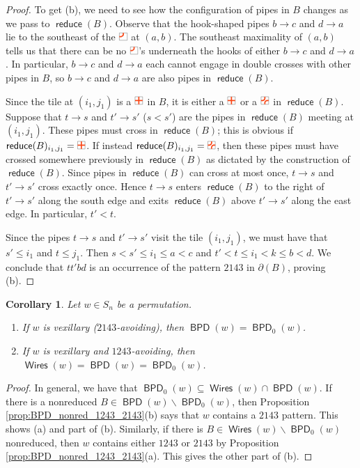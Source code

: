 \documentclass[11pt]{article}
\newtheorem{corollary}[theo]{Corollary}
\theoremstyle{definition}
\numberwithin{equation}{section}
\newcommand{\sseq}{\subseteq}
\newcommand{\sm}{\smallsetminus}
\DeclareMathOperator{\reduce}{\mathsf{reduce}}
\DeclareMathOperator{\Wires}{\mathsf{Wires}}
\DeclareMathOperator{\BPD}{\mathsf{BPD}}
\newcommand{\pipecolor}{UForange}
\newcommand{\tilescale}{0.27}
\newcommand{\drawSquare}{
    \draw[
        xshift=0.5cm,yshift=0.5cm,
        black,opacity=0.5,thin
    ] (0,0) rectangle (1,1);
}
\newcommand{\drawHorizontal}[2]{
    \draw[color=\pipecolor,very thick]
    (#1-0.5,#2) to (#1+0.5,#2);
}
\newcommand{\drawVertical}[2]{
    \draw[color=\pipecolor,very thick]
    (#1,#2-0.5) to (#1,#2+0.5);
}
\newcommand{\drawCross}[2]{
    \drawHorizontal{#1}{#2}
    \drawVertical{#1}{#2}
}
\newcommand{\drawRelbow}[2]{
    \draw[color=\pipecolor,very thick]
    (#1,#2-0.5) to (#1,#2-0.25) to[bend left] (#1+0.25,#2) to (#1+0.5,#2);
}
\newcommand{\drawJelbow}[2]{
    \draw[color=\pipecolor,very thick]
    (#1,#2+0.5) to (#1,#2+0.25) to[bend left] (#1-0.25,#2) to (#1-0.5,#2);
}
\newcommand{\drawBump}[2]{
    \drawRelbow{#1}{#2}
    \drawJelbow{#1}{#2}
}
\newcommand{\cross}[1][scale=\tilescale,baseline=4pt]{
    \begin{tikzpicture}[#1]
    \drawSquare
    \drawCross11
    \end{tikzpicture}
}
\newcommand{\jelbow}[1][scale=\tilescale,baseline=4pt]{
    \begin{tikzpicture}[#1]
    \drawSquare
    \drawJelbow11
    \end{tikzpicture}
}
\newcommand{\bump}[1][scale=\tilescale,baseline=4pt]{
    \begin{tikzpicture}[#1]
    \drawSquare
    \drawBump11
    \end{tikzpicture}
}
\begin{document}
\begin{proof}
    To get (b), we need to see how the configuration of pipes in $B$ changes as we pass to $\reduce(B)$.
    Observe that the hook-shaped pipes $b\to c$ and $d\to a$ lie to the southeast of the $\jelbow$ at $(a,b)$.
    The southeast maximality of $(a,b)$ tells us that there can be no $\jelbow$'s underneath the hooks of either $b\to c$ and $d\to a$.
    In particular, $b\to c$ and $d\to a$ each cannot engage in double crosses with other pipes in $B$, so $b\to c$ and $d\to a$ are also pipes in $\reduce(B)$.
    
    Since the tile at $(i_1,j_1)$ is a $\cross$ in $B$, it is either a $\cross$ or a $\bump$ in $\reduce(B)$.
    Suppose that $t\to s$ and $t'\to s'$ ($s< s'$) are the pipes in $\reduce(B)$ meeting at $(i_1,j_1)$.
    These pipes must cross in $\reduce(B)$; this is obvious if $\reduce(B)_{i_1,j_1} = \cross$.
    If instead $\reduce(B)_{i_1,j_1}=\bump$, then these pipes must have crossed somewhere previously in $\reduce(B)$ as dictated by the construction of $\reduce(B)$.
    Since pipes in $\reduce(B)$ can cross at most once, $t\to s$ and $t'\to s'$ cross exactly once.
    Hence $t\to s$ enters $\reduce(B)$ to the right of $t'\to s'$ along the south edge and exits $\reduce(B)$ above $t'\to s'$ along the east edge. In particular, $t'< t$.
    
Since the pipes $t\to s$ and $t'\to s'$ visit the tile $(i_1,j_1)$, we must have that $s'\leq i_1$ and $t\leq j_1$.
Then $s< s'\leq i_1\leq a< c$ and $t'<t\leq i_1< k\leq b< d$.
We conclude that $tt'bd$ is an occurrence of the pattern $2143$ in $\partial(B)$, proving (b).
\end{proof}

\begin{corollary}
\label{cor:BPD_1243_2143}
    Let $w\in S_n$ be a permutation.
    \begin{enumerate}
        \item[(a)] If $w$ is vexillary \textup{(}$2143$-avoiding\textup{)}, then $\BPD(w) = \BPD_0(w)$.
        \item[(b)] If $w$ is vexillary and $1243$-avoiding, then 
        $\Wires(w) = \BPD(w) = \BPD_0(w)$.
    \end{enumerate}
\end{corollary}

\begin{proof}
    In general, we have that $\BPD_0(w) \sseq \Wires(w)\cap \BPD(w)$.
    If there is a nonreduced $B\in \BPD(w)\sm \BPD_0(w)$, then Proposition \ref{prop:BPD_nonred_1243_2143}(b) says that $w$ contains a $2143$ pattern.
    This shows (a) and part of (b).
    Similarly, if there is $B\in \Wires(w)\sm \BPD_0(w)$ nonreduced, then $w$ contains either $1243$ or $2143$ by Proposition \ref{prop:BPD_nonred_1243_2143}(a).
    This gives the other part of (b).
\end{proof}
\end{document}
